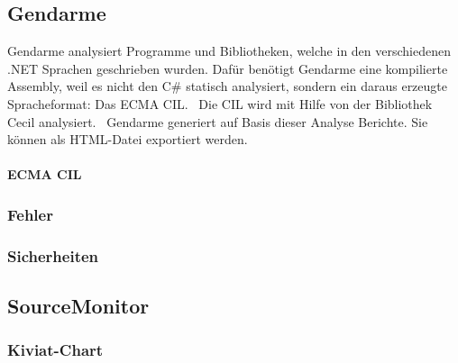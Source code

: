 \subsection{Gendarme}
Gendarme analysiert Programme und Bibliotheken, welche in den verschiedenen .NET Sprachen geschrieben wurden. Dafür benötigt Gendarme eine kompilierte Assembly, weil es nicht den C\# statisch analysiert, sondern ein daraus erzeugte Spracheformat: Das ECMA CIL.~\cite{ecma} Die CIL wird mit Hilfe von der Bibliothek Cecil analysiert.~\cite{cecil} Gendarme generiert auf Basis dieser Analyse Berichte. Sie können als HTML-Datei exportiert werden.

\paragraph{ECMA CIL}

\subsubsection{Fehler}

\subsubsection{Sicherheiten}


\subsection{SourceMonitor}

\subsubsection{Kiviat-Chart}
